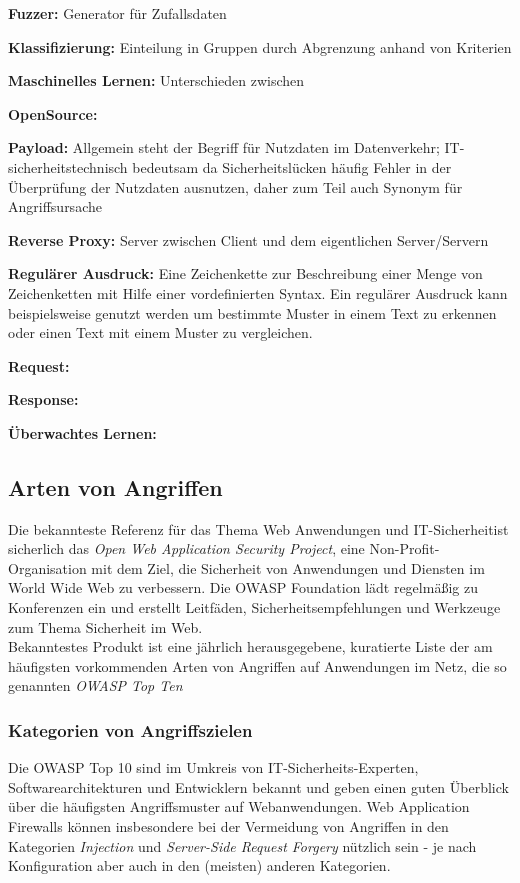 \textbf{Fuzzer:} Generator für Zufallsdaten

\textbf{Klassifizierung:} Einteilung in Gruppen durch Abgrenzung anhand von Kriterien

\textbf{Maschinelles Lernen:} Unterschieden zwischen 

\textbf{OpenSource:}

\textbf{Payload:} Allgemein steht der Begriff für Nutzdaten im Datenverkehr; IT-sicherheitstechnisch bedeutsam da Sicherheitslücken häufig Fehler in der Überprüfung der Nutzdaten ausnutzen, daher zum Teil auch Synonym für Angriffsursache

\textbf{Reverse Proxy:} Server zwischen Client und dem eigentlichen Server/Servern 

\textbf{Regulärer Ausdruck:} Eine Zeichenkette zur Beschreibung einer Menge von Zeichenketten mit Hilfe einer vordefinierten Syntax. Ein regulärer Ausdruck kann beispielsweise genutzt werden um bestimmte Muster in einem Text zu erkennen oder einen Text mit einem Muster zu vergleichen.

\textbf{Request:} 

\textbf{Response:}

\textbf{Überwachtes Lernen:} 

\subsection{Arten von Angriffen}

Die bekannteste Referenz für das Thema \glqq Web Anwendungen und IT-Sicherheit\grqq  ist sicherlich das \emph{Open Web Application Security Project\textsuperscript{\textregistered}}, eine Non-Profit-Organisation mit dem Ziel, die Sicherheit von Anwendungen und Diensten im World Wide Web zu verbessern\cite{wpowasp}. Die OWASP Foundation lädt regelmäßig zu Konferenzen ein und erstellt Leitfäden, Sicherheitsempfehlungen und Werkzeuge zum Thema Sicherheit im Web.\\
Bekanntestes Produkt ist eine jährlich herausgegebene, kuratierte Liste der am häufigsten vorkommenden Arten von Angriffen auf Anwendungen im Netz, die so genannten \emph{OWASP Top Ten}\cite{owasp10}

\subsubsection{Kategorien von Angriffszielen}

Die OWASP Top 10 sind im Umkreis von IT-Sicherheits-Experten, Softwarearchitekturen und Entwicklern bekannt und geben einen guten Überblick über die häufigsten Angriffsmuster auf Webanwendungen. Web Application Firewalls können insbesondere bei der Vermeidung von Angriffen in den Kategorien \emph{Injection} und \emph{Server-Side Request Forgery} nützlich sein - je nach Konfiguration aber auch in den (meisten) anderen Kategorien.  

